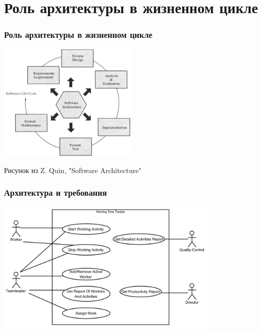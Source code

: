 \documentclass[xetex,mathserif,serif]{beamer}
\begin{document}
    \section{Роль архитектуры в жизненном цикле}

    \begin{frame}
        \frametitle{Роль архитектуры в жизненном цикле}
        \begin{center}
            \includegraphics[width=0.5\textwidth]{architectureLifeCycle.png}

            \begin{tiny}
                Рисунок из Z. Quin, "Software Architecture"
            \end{tiny}
        \end{center}
    \end{frame}

    \begin{frame}
        \frametitle{Архитектура и требования}
        \begin{center}
            \includegraphics[width=0.8\textwidth]{useCaseDiagram.png}
        \end{center}
    \end{frame}
\end{document}
